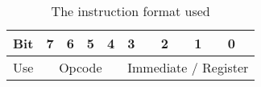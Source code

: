 \begin{table}
\caption{The instruction format used}
\label{tab:instruction}
\centering
\begin{tabular}{|p{1cm}|p{1cm}|p{1cm}|p{1cm}|p{1cm}|p{1cm}|p{1cm}|p{1cm}|p{1cm}|} \hline
Bit & 7 & 6 & 5 & 4 & 3 & 2 & 1 & 0 \\ \hline
Use & \multicolumn{4}{|c|}{Opcode} & \multicolumn{4}{|c|}{Immediate / Register} \\ \hline
\end{tabular}
\end{table}
